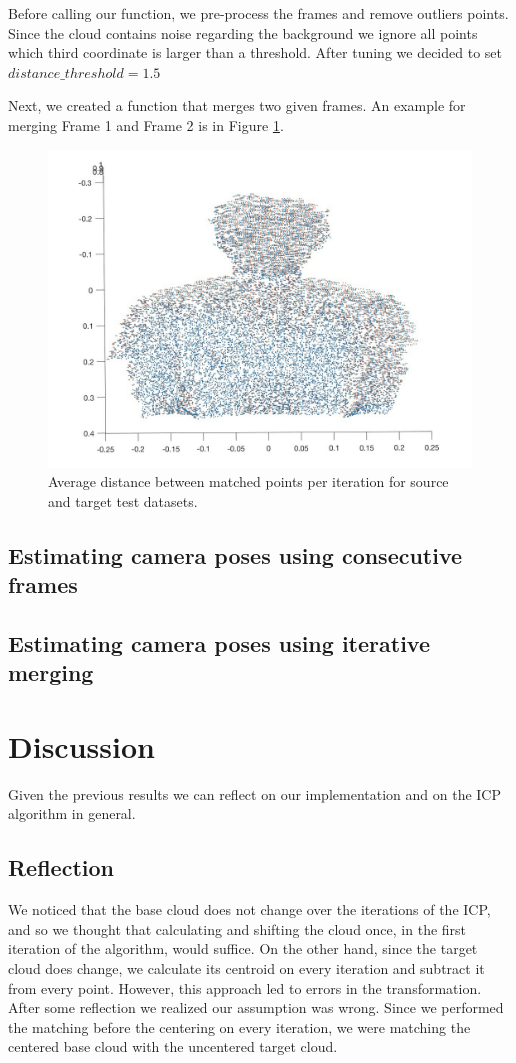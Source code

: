 \documentclass[11pt]{article}
\begin{document}
Before calling our function, we pre-process the frames and remove outliers points. Since the cloud contains noise regarding the background we ignore all points which third coordinate is larger than a threshold. After tuning we decided to set $ distance\_threshold = 1.5 $

Next, we created a function that merges two given frames. An example for merging Frame 1 and Frame 2 is in Figure \ref{fig:simple_consecutive}. 

\begin{figure}[H]
	\centering
	\includegraphics[width=.6\textwidth]{img/consecutive_matched.jpg}
	\caption{Average distance between matched points per iteration for source and target test datasets.}
	\label{fig:simple_consecutive}
\end{figure}

\subsection{Estimating camera poses using consecutive frames}



\subsection{Estimating camera poses using iterative merging}



\section{Discussion}
\label{reflection}
Given the previous results we can reflect on our implementation and on the ICP algorithm in general.

\subsection{Reflection}
We noticed that the base cloud does not change over the iterations of the ICP, and so we thought that calculating and shifting the cloud once, in the first iteration of the algorithm, would suffice. On the other hand, since the target cloud does change, we calculate its centroid on every iteration and subtract it from every point. However, this approach led to errors in the transformation. After some reflection we realized our assumption was wrong. Since we performed the matching before the centering on every iteration, we were matching the centered base cloud with the uncentered target cloud.
\end{document}
